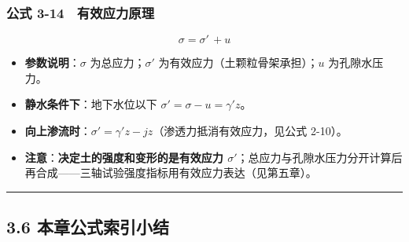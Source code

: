 \documentclass[
]{article}
\providecommand{\tightlist}{%
  \setlength{\itemsep}{0pt}\setlength{\parskip}{0pt}}
\begin{document}
\subsubsection{公式
3-14　有效应力原理}\label{ux516cux5f0f-3-14-ux6709ux6548ux5e94ux529bux539fux7406}

\[\sigma=\sigma'\,+u\]

\begin{itemize}
\tightlist
\item
  \textbf{参数说明}：\(\sigma\) 为总应力；\(\sigma'\)
  为有效应力（土颗粒骨架承担）；\(u\) 为孔隙水压力。
\item
  \textbf{静水条件下}：地下水位以下 \(\sigma'=\sigma-u=\gamma' z\)。
\item
  \textbf{向上渗流时}：\(\sigma'=\gamma' z-jz\)（渗透力抵消有效应力，见公式
  2-10）。
\item
  \textbf{注意}：\textbf{决定土的强度和变形的是有效应力
  \(\sigma'\)}；总应力与孔隙水压力分开计算后再合成------三轴试验强度指标用有效应力表达（见第五章）。
\end{itemize}

\begin{center}\rule{0.5\linewidth}{0.5pt}\end{center}

\subsection{3.6
本章公式索引小结}\label{ux672cux7ae0ux516cux5f0fux7d22ux5f15ux5c0fux7ed3-2}
\end{document}
